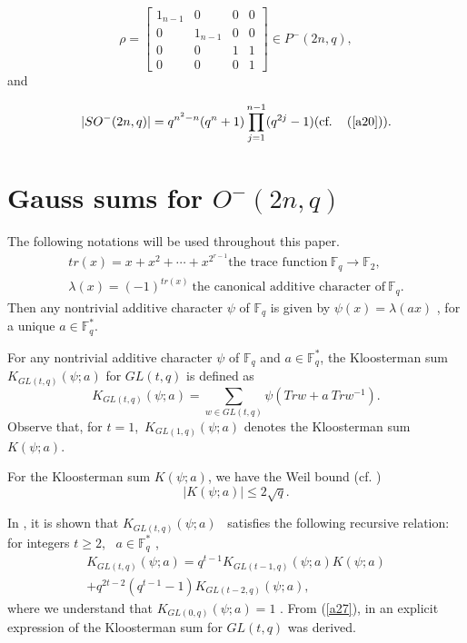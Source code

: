 \documentclass[a4,12pt]{elsart}
\begin{document}
\[
\rho=
\begin{bmatrix}
   1_{n-1} & 0       & 0 & 0  \\
   0       & 1_{n-1} & 0 & 0  \\
   0       & 0       & 1 &1   \\
   0       & 0       & 0 & 1
\end{bmatrix}\in P^-(2n,q),
\]
and

\begin{equation*}
|SO^{-}(2n,q)|=q^{n^{2}-n}(q^{n}+1)\prod_{j=1}^{n-1}(q^{2j}-1)
\textrm{(cf. \; (\ref{a20}))}.
\end{equation*}

\section{Gauss sums for $O^{-}(2n,q)$}
The following notations will be used throughout this paper.
\begin{gather*}
tr(x)=x+x^2+\cdots+x^{2^{r-1}} \text{the trace function} ~{\mathbb{F}}_q
\rightarrow {\mathbb{F}}_2,\\
\lambda(x) = (-1)^{tr(x)} ~\text{the canonical additive character
of} ~{\mathbb{F}}_q.
\end{gather*}
Then any nontrivial additive character $\psi$ of ${\mathbb{F}}_q$ is given by
$\psi(x) = \lambda(ax)$ , for a unique $a \in {\mathbb{F}}_q^*$.

For any nontrivial additive character $\psi$ of ${\mathbb{F}}_q$ and $a \in
{\mathbb{F}}_q^*$, the Kloosterman sum $K_{GL(t,q)}(\psi ; a)$ for $GL(t,q)$
is defined as
\begin{equation}\label{a25}
K_{GL(t,q)}(\psi ; a) = \sum_{w \in GL(t,q)} \psi(Trw + a~Trw^{-1}).
\end{equation}
Observe that, for $t=1$,~$ K_{GL(1,q)}(\psi ; a)$ denotes the
Kloosterman sum $K(\psi ; a)$.

For the Kloosterman sum $K(\psi ; a)$, we have the Weil bound (cf.
\cite{RH})
\begin{equation}\label{a26}
\mid K(\psi ; a) \mid \leq 2\sqrt{q}.
\end{equation}

In \cite{D1}, it is shown that $K_{GL(t,q)}(\psi ; a)$ ~satisfies
the following recursive relation: for integers $t \geq 2$, ~$a \in
{\mathbb{F}}_q^*$ ,
\begin{multline}\label{a27}
K_{GL(t,q)}(\psi ; a) = q^{t-1}K_{GL(t-1,q)}(\psi ; a)K(\psi
;a)\\
+ q^{2t-2}(q^{t-1}-1)K_{GL(t-2,q)}(\psi ; a),
\end{multline}
where we understand that $K_{GL(0,q)}(\psi ; a)=1$ . From
(\ref{a27}), in \cite{D1} an explicit expression of the Kloosterman
sum for
$GL(t,q)$ was derived.\\
\end{document}
